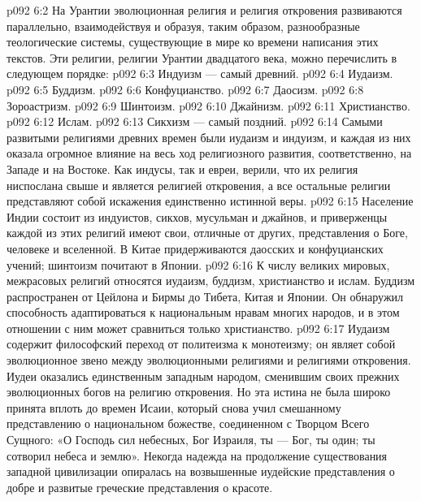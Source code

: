 \vs p092 6:2 \pc На Урантии эволюционная религия и религия откровения развиваются параллельно, взаимодействуя и образуя, таким образом, разнообразные теологические системы, существующие в мире ко времени написания этих текстов. Эти религии, религии Урантии двадцатого века, можно перечислить в следующем порядке:
\vs p092 6:3 \bibnobreakspace Индуизм --- самый древний.
\vs p092 6:4 \bibnobreakspace Иудаизм.
\vs p092 6:5 \bibnobreakspace Буддизм.
\vs p092 6:6 \bibnobreakspace Конфуцианство.
\vs p092 6:7 \bibnobreakspace Даосизм.
\vs p092 6:8 \bibnobreakspace Зороастризм.
\vs p092 6:9 \bibnobreakspace Шинтоизм.
\vs p092 6:10 \bibnobreakspace Джайнизм.
\vs p092 6:11 \bibnobreakspace Христианство.
\vs p092 6:12 \bibnobreakspace Ислам.
\vs p092 6:13 \bibnobreakspace Сикхизм --- самый поздний.
\vs p092 6:14 \pc Самыми развитыми религиями древних времен были иудаизм и индуизм, и каждая из них оказала огромное влияние на весь ход религиозного развития, соответственно, на Западе и на Востоке. Как индусы, так и евреи, верили, что их религия ниспослана свыше и является религией откровения, а все остальные религии представляют собой искажения единственно истинной веры.
\vs p092 6:15 Население Индии состоит из индуистов, сикхов, мусульман и джайнов, и приверженцы каждой из этих религий имеют свои, отличные от других, представления о Боге, человеке и вселенной. В Китае придерживаются даосских и конфуцианских учений; шинтоизм почитают в Японии.
\vs p092 6:16 К числу великих мировых, межрасовых религий относятся иудаизм, буддизм, христианство и ислам. Буддизм распространен от Цейлона и Бирмы до Тибета, Китая и Японии. Он обнаружил способность адаптироваться к национальным нравам многих народов, и в этом отношении с ним может сравниться только христианство.
\vs p092 6:17 Иудаизм содержит философский переход от политеизма к монотеизму; он являет собой эволюционное звено между эволюционными религиями и религиями откровения. Иудеи оказались единственным западным народом, сменившим своих прежних эволюционных богов на религию откровения. Но эта истина не была широко принята вплоть до времен Исаии, который снова учил смешанному представлению о национальном божестве, соединенном с Творцом Всего Сущного: «О Господь сил небесных, Бог Израиля, ты --- Бог, ты один; ты сотворил небеса и землю». Некогда надежда на продолжение существования западной цивилизации опиралась на возвышенные иудейские представления о добре и развитые греческие представления о красоте.
